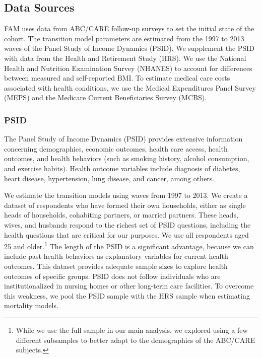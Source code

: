 \subsection{Data Sources} \label{section:data}
\noindent FAM uses data from ABC/CARE follow-up surveys to set the initial state of the cohort.
The transition model parameters are estimated from the 1997 to 2013 waves of the Panel Study of Income Dynamics (PSID).
We supplement the PSID with data from the Health and Retirement Study (HRS). We use the National Health and Nutrition Examination Survey (NHANES)
to account for differences between measured and self-reported BMI.
To estimate medical care costs associated with health conditions, we use the Medical Expenditures Panel Survey (MEPS) and the Medicare Current Beneficiaries Survey (MCBS).


\subsubsection{PSID}
\label{section:data_psid}

\noindent The Panel Study of Income Dynamics (PSID) provides extensive information concerning demographics, economic outcomes, health care access, health outcomes, and health behaviors (such as smoking history, alcohol consumption, and exercise habits). Health outcome variables include diagnosis of diabetes, heart disease, hypertension, lung disease, and cancer, among others.

\noindent We estimate the transition models using waves from 1997 to 2013. We create a dataset of respondents who have formed their own households, either
as single heads of households, cohabiting partners, or married partners. These heads, wives, and husbands respond to the richest
set of PSID questions, including the health questions that are critical for our purposes. We use all respondents aged 25 and older.\footnote{While we use the full sample in our main analysis, we explored using a few different subsamples to better adapt to the demographics of the ABC/CARE subjects.}
The length of the PSID is a significant advantage, because we can include past health behaviors as explanatory variables for current health outcomes. This dataset provides adequate sample sizes to explore health outcomes of specific groups.
PSID does not follow individuals who are institutionalized in nursing homes or other long-term care facilities. To overcome this weakness, we pool the PSID sample with the HRS sample when
estimating mortality models.

